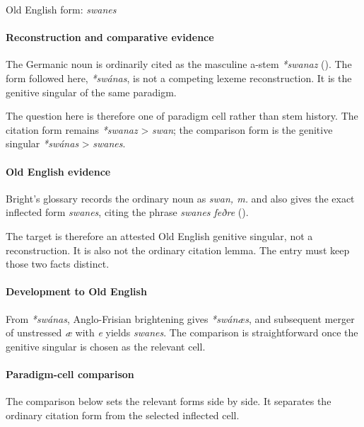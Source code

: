\documentclass[
  british,
  a4paper,
]{article}
\begin{document}
Old English form: \emph{swanes}

\paragraph{Reconstruction and comparative
evidence}\label{reconstruction-and-comparative-evidence-29}

The Germanic noun is ordinarily cited as the masculine a-stem
\emph{*swanaz} (). The form
followed here, \emph{*swánas}, is not a competing lexeme reconstruction.
It is the genitive singular of the same paradigm.

The question here is therefore one of paradigm cell rather than stem
history. The citation form remains \emph{*swanaz} \textgreater{}
\emph{swan}; the comparison form is the genitive singular \emph{*swánas}
\textgreater{} \emph{swanes}.

\paragraph{Old English evidence}\label{old-english-evidence-29}

Bright's glossary records the ordinary noun as \emph{swan, m.} and also
gives the exact inflected form \emph{swanes}, citing the phrase
\emph{swanes feðre} ().

The target is therefore an attested Old English genitive singular, not a
reconstruction. It is also not the ordinary citation lemma. The entry
must keep those two facts distinct.

\paragraph{Development to Old
English}\label{development-to-old-english-29}

From \emph{*swánas}, Anglo-Frisian brightening gives \emph{*swánæs}, and
subsequent merger of unstressed \emph{æ} with \emph{e} yields
\emph{swanes}. The comparison is straightforward once the genitive
singular is chosen as the relevant cell.

\paragraph{Paradigm-cell comparison}\label{paradigm-cell-comparison}

The comparison below sets the relevant forms side by side. It separates
the ordinary citation form from the selected inflected cell.
\end{document}
